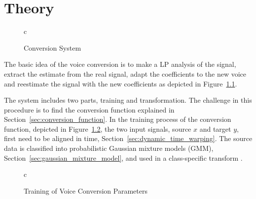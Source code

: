 \chapter{Theory} %
\label{cha:theory}
\begin{figure}[htbp]
  \centering
   \begin{tabular}[h]{c}
  \end{tabular}
  \caption{Conversion System}
  \label{fig:VC}
\end{figure}

The basic idea of the voice conversion is to make a LP analysis of the signal, extract the estimate from the real signal, adapt the coefficients to the new voice and reestimate the signal with the new coefficients as depicted in Figure~\ref{fig:VC}.

The system includes two parts, training and transformation. The challenge in this procedure is to find the conversion function explained in Section~\ref{sec:conversion_function}. In the training process of the conversion function, depicted in Figure~\ref{fig:VC_training}, the two input signals, source $x$ and target $y$, first need to be aligned in time, Section~\ref{sec:dynamic_time_warping}. The source data is classified into probabilistic Gaussian mixture models (GMM), Section~\ref{sec:gaussian_mixture_model}, and used in a class-specific transform \cite{stylianou09}.
\begin{figure}[htbp]
	\centering
	\begin{tabular}[h]{c}
	\end{tabular}
	\caption{Training of Voice Conversion Parameters}
	\label{fig:VC_training}
\end{figure}


